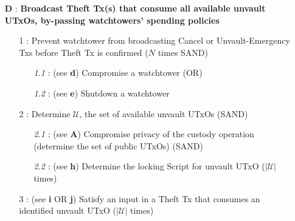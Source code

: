\documentclass[runningheads]{llncs}
\begin{document}
{\footnotesize
\begin{itemize}[noitemsep,parsep=0pt,partopsep=0pt, leftmargin=0.7cm]
\item[\textbf{D} :] \textbf{Broadcast Theft Tx(s) that consume all available unvault UTxOs, by-passing watchtowers' spending policies}
\begin{itemize}[noitemsep,topsep=0pt,parsep=0pt,partopsep=0pt, leftmargin=0.8cm]
\item[1 :] Prevent watchtower from broadcasting Cancel or Unvault-Emergency Txs before Theft Tx is confirmed ($N$ times SAND)
\begin{itemize}[noitemsep,topsep=0pt,parsep=0pt,partopsep=0pt, leftmargin=0.9cm]
\item[\textit{1.1} :] (see \textbf{d}) Compromise a watchtower (OR)
\item[\textit{1.2} :] (see \textbf{e}) Shutdown a watchtower
\end{itemize}
\item[2 :] Determine $\mathcal{U}$, the set of available unvault UTxOs (SAND)
\begin{itemize}[noitemsep,topsep=0pt,parsep=0pt,partopsep=0pt, leftmargin=0.9cm]
\item[\textit{2.1} :] (see \textbf{A}) Compromise privacy of the custody operation (determine the set of public UTxOs) (SAND)
\item[\textit{2.2} :] (see \textbf{h}) Determine the locking Script for unvault UTxO ($|\mathcal{U}|$ times)
\end{itemize}
\item[3 :] (see \textbf{i} OR \textbf{j}) Satisfy  an  input  in  a  Theft  Tx  that  consumes  an  identified  unvault UTxO ($|\mathcal{U}|$ times)
\end{itemize}
\end{itemize}
}
\end{document}
